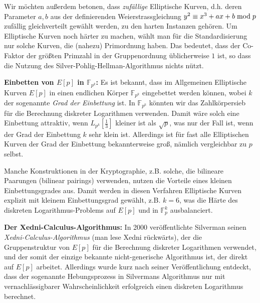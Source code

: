 \begin{refsegment}
Wir möchten außerdem betonen, dass {\em zufällige} Elliptische Kurven, d.h. deren Parameter $a,b$ aus der definierenden Weierstrassgleichung $y^2 \equiv x^3+ax+b \hspace{1mm}{\rm mod}\hspace{1mm} p$ zufällig gleichverteilt
gewählt werden, zu den harten Instanzen gehören. Um Elliptische Kurven noch härter zu machen, wählt man für die Standardisierung nur solche Kurven, die (nahezu) Primordnung haben. Das bedeutet, dass der Co-Faktor der größten Primzahl in der Gruppenordnung üblicherweise $1$ ist, so dass die Nutzung des Silver-Pohlig-Hellman-Algorithmus nichts nützt.

\noindent \textbf{Einbetten von $E[p]$ in $\mathbb{F}_{p^k}$:}
Es ist bekannt, dass im Allgemeinen Elliptische Kurven $E[p]$ in einen endlichen Körper $\mathbb{F}_{p^k}$ eingebettet werden können, wobei $k$ der sogenannte {\em Grad der Einbettung} ist. In $\mathbb{F}_{p^k}$ könnten wir das Zahlkörpersieb für die Berechnung diskreter Logarithmen verwenden. Damit wäre solch eine Einbettung attraktiv, wenn $L_{p^k}[\frac 1 3]$ kleiner ist als $\sqrt p$, was nur der Fall ist, wenn der Grad der Einbettung $k$ sehr klein ist. Allerdings ist für fast alle Elliptischen Kurven der Grad der Einbettung bekannterweise groß, nämlich vergleichbar zu $p$ selbst.

Manche Konstruktionen in der Kryptographie, z.B. solche, die bilineare Paarungen (bilinear pairings) verwenden, nutzen die Vorteile eines kleinen Einbettungsgrades aus. Damit werden in diesen Verfahren Elliptische Kurven explizit mit kleinem Einbettungsgrad gewählt, z.B. $k=6$, was die Härte des diskreten Logarithmus-Problems auf $E[p]$ und in $\mathbb{F}_p^k$ ausbalanciert.

\noindent \textbf{Der Xedni-Calculus-Algorithmus:}
In 2000 veröffentlichte Silverman seinen {\em Xedni-Calculus-Algorithmus} (man lese Xedni rückwärts), der die Gruppenstruktur von $E[p]$ für die Berechnung diskreter Logarithmen verwendet, und der somit der einzige bekannte nicht-generische Algorithmus ist, der direkt auf $E[p]$ arbeitet. Allerdings wurde kurz nach seiner Veröffentlichung entdeckt, dass der sogenannte Hebungsprozess in Silvermans Algorithmus nur mit vernachlässigbarer Wahrscheinlichkeit erfolgreich einen diskreten Logarithmus berechnet.




\end{refsegment}
